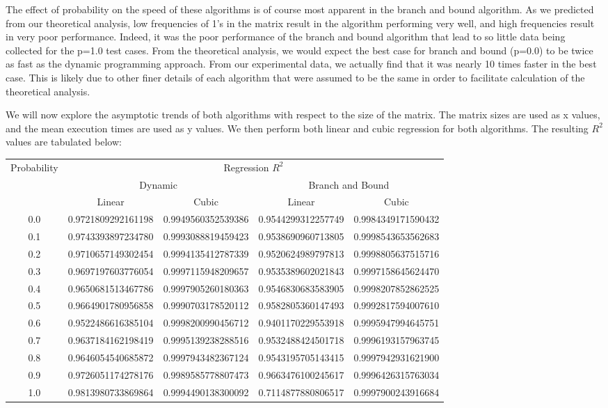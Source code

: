 \documentclass{article}
\begin{document}
The effect of probability on the speed of these algorithms is of course most apparent in the branch and bound algorithm.
As we predicted from our theoretical analysis, low frequencies of 1's in the matrix result in the algorithm performing very well, and high frequencies result in very poor performance.
Indeed, it was the poor performance of the branch and bound algorithm that lead to so little data being collected for the p=1.0 test cases.
From the theoretical analysis, we would expect the best case for branch and bound (p=0.0) to be twice as fast as the dynamic programming approach.
From our experimental data, we actually find that it was nearly 10 times faster in the best case.
This is likely due to other finer details of each algorithm that were assumed to be the same in order to facilitate calculation of the theoretical analysis.

We will now explore the asymptotic trends of both algorithms with respect to the size of the matrix.
The matrix sizes are used as x values, and the mean execution times are used as y values.
We then perform both linear and cubic regression for both algorithms.
The resulting $R^2$ values are tabulated below:

\FloatBarrier
\begin{table}[h!]
\centering
\begin{tabular}{|c|c|c|c|c|}
\hline
\multirow{3}{*}{Probability} & \multicolumn{4}{|c|}{Regression $R^2$}\\
\cline{2-5}
&\multicolumn{2}{|c|}{Dynamic} & \multicolumn{2}{|c|}{Branch and Bound}\\
\cline{2-5}
&Linear & Cubic & Linear & Cubic \\
\hline
0.0 & 0.9721809292161198 & 0.9949560352539386 & 0.9544299312257749 & 0.9984349171590432\\
0.1 & 0.9743393897234780 & 0.9993088819459423 & 0.9538690960713805 & 0.9998543653562683\\
0.2 & 0.9710657149302454 & 0.9994135412787339 & 0.9520624989797813 & 0.9998805637515716\\
0.3 & 0.9697197603776054 & 0.9997115948209657 & 0.9535389602021843 & 0.9997158645624470\\
0.4 & 0.9650681513467786 & 0.9997905260180363 & 0.9546830683583905 & 0.9998207852862525\\
0.5 & 0.9664901780956858 & 0.9990703178520112 & 0.9582805360147493 & 0.9992817594007610\\
0.6 & 0.9522486616385104 & 0.9998200990456712 & 0.9401170229553918 & 0.9995947994645751\\
0.7 & 0.9637184162198419 & 0.9995139238288516 & 0.9532488424501718 & 0.9996193157963745\\
0.8 & 0.9646054540685872 & 0.9997943482367124 & 0.9543195705143415 & 0.9997942931621900\\
0.9 & 0.9726051174278176 & 0.9989585778807473 & 0.9663476100245617 & 0.9996426315763034\\
1.0 & 0.9813980733869864 & 0.9994490138300092 & 0.7114877880806517 & 0.9997900243916684\\
\hline
\end{tabular}
\end{table}
\FloatBarrier
\end{document}
